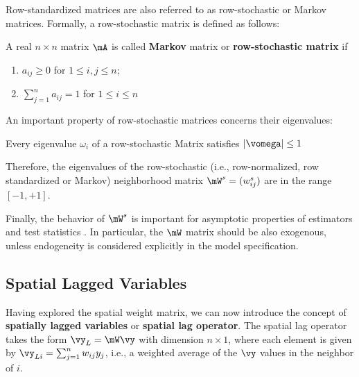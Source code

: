 \documentclass[english,12pt]{book}\usepackage[]{graphicx}\usepackage[]{xcolor}
\begin{document}
Row-standardized matrices are also referred to as row-stochastic or Markov matrices. Formally, a row-stochastic matrix is defined as follows:
\begin{definition}
	A real $n\times n$ matrix $\mA$ is called \textbf{Markov} matrix or \textbf{row-stochastic matrix} if 
		\begin{enumerate}
			\item $a_{ij} \geq 0$ for $1\leq i, j \leq n$;
			\item $\sum_{j=1}^n a_{ij} = 1$ for $1\leq i \leq n$
		\end{enumerate}
\end{definition}

An important property of row-stochastic matrices concerns their eigenvalues:

\begin{theorem}\label{teo:eigen_values}
	Every eigenvalue $\omega_i$ of a row-stochastic Matrix satisfies $\left|\vomega\right|\leq 1$
\end{theorem}

Therefore, the eigenvalues of the row-stochastic (i.e., row-normalized, row standardized or Markov) neighborhood matrix $\mW^s=(w_{ij}^s)$ are in the range $\left[-1, +1\right]$.

Finally, the behavior of $\mW^s$ is important for asymptotic properties of estimators and test statistics \citep[][pp. 244]{AnselinBera1998}. In particular, the $\mW$ matrix should be also exogenous, unless endogeneity is considered explicitly in the model specification. 

\subsection{Spatial Lagged Variables}\label{sec:spatial_lag_var}

Having explored the spatial weight matrix, we can now introduce the concept of  \textbf{spatially lagged variables} or \textbf{spatial lag operator}. The spatial lag operator takes the form $\vy_L = \mW\vy$ with dimension $n \times 1$, where each element is given by $\vy_{Li} = \sum_{j = 1}^nw_{ij}y_j$, i.e., a weighted average of the $\vy$ values in the neighbor of $i$.
\end{document}
